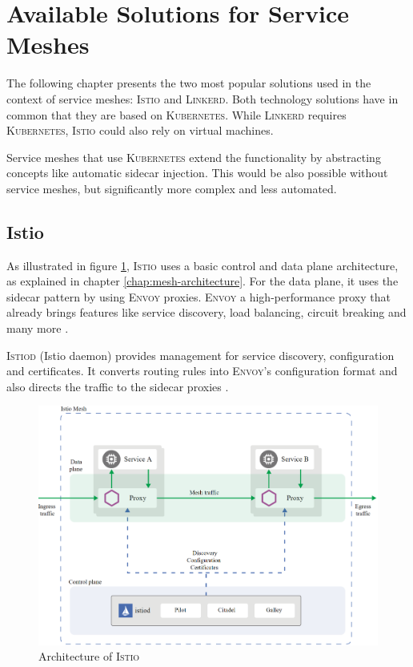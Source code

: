 \section{Available Solutions for Service Meshes}

The following chapter presents the two most popular solutions used in the context of service meshes: \textsc{Istio} and \textsc{Linkerd}. Both technology solutions have in common that they are based on \textsc{Kubernetes}. While \textsc{Linkerd} requires \textsc{Kubernetes}, \textsc{Istio} could also rely on virtual machines.

Service meshes that use \textsc{Kubernetes} extend the functionality by abstracting concepts like automatic sidecar injection. This would be also possible without service meshes, but significantly more complex and less automated.

\subsection{Istio}

As illustrated in figure \ref{fig:arch-istio}, \textsc{Istio} uses a basic control and data plane architecture, as explained in chapter \ref{chap:mesh-architecture}. For the data plane, it uses the sidecar pattern by using \textsc{Envoy} proxies. \textsc{Envoy} a high-performance proxy that already brings features like service discovery, load balancing, circuit breaking and many more \cite{istio-docs-arch}.

\textsc{Istiod} (Istio daemon) provides management for service discovery, configuration and certificates. It converts routing rules into \textsc{Envoy}'s configuration format and also directs the traffic to the sidecar proxies \cite{istio-docs-arch}.

\begin{figure}
    \includegraphics[width=\columnwidth]{img/istio_architecture.png}
    \caption{Architecture of \textsc{Istio} \cite{istio-docs-arch}}
    \label{fig:arch-istio}
\end{figure}

